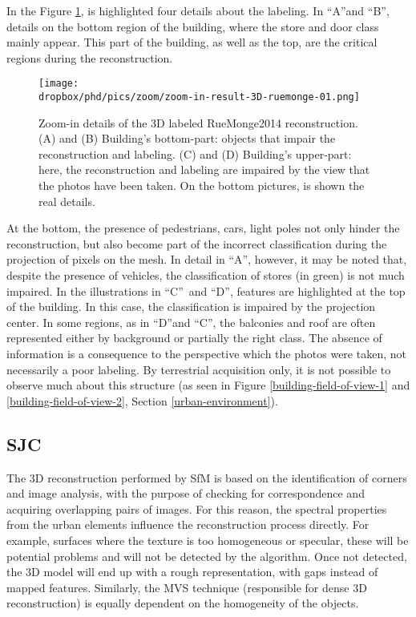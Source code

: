 In the Figure \ref{zoom-ruemonge}, is highlighted four details about the labeling. In \textquotedblleft A\textquotedblright and \textquotedblleft B\textquotedblright, details on the bottom region of the building, where the store and door class mainly appear. This part of the building, as well as the top, are the critical regions during the reconstruction. 
\begin{figure}[!htp]
    \centering	   
    \caption{Zoom-in details of the 3D labeled RueMonge2014 reconstruction. (A) and (B) Building's bottom-part: objects that impair the reconstruction and labeling. (C) and (D) Building's upper-part: here, the reconstruction and labeling are impaired by the view that the photos have been taken. On the bottom pictures, is shown the real details.}
    \vspace{6mm}    
    \texttt{[image: \\dropbox/phd/pics/zoom/zoom-in-result-3D-ruemonge-01.png]}
    \vspace{2mm}
	\legenda{}
    \label{zoom-ruemonge}
\end{figure}

At the bottom, the presence of pedestrians, cars, light poles not only hinder the reconstruction, but also become part of the incorrect classification during the projection of pixels on the mesh. In detail in \textquotedblleft A\textquotedblright, however, it may be noted that, despite the presence of vehicles, the classification of stores (in green) is not much impaired. In the illustrations in \textquotedblleft C\textquotedblright~and \textquotedblleft D\textquotedblright, features are highlighted at the top of the building. In this case, the classification is impaired by the projection center. In some regions, as in \textquotedblleft D\textquotedblright and \textquotedblleft C\textquotedblright, the balconies and roof are often represented either by background or partially the right class. The absence of information is a consequence to the perspective which the photos were taken, not necessarily a poor labeling. By terrestrial acquisition only, it is not possible to observe much about this structure (as seen in Figure \ref{building-field-of-view-1} and \ref{building-field-of-view-2}, Section \ref{urban-environment}).

\subsection{SJC}
The 3D reconstruction performed by SfM is based on the identification of corners and image analysis, with the purpose of checking for correspondence and acquiring overlapping pairs of images. For this reason, the spectral properties from the urban elements influence the reconstruction process directly. For example, surfaces where the texture is too homogeneous or specular, these will be potential problems and will not be detected by the algorithm. Once not detected, the 3D model will end up with a rough representation, with gaps instead of mapped features. Similarly, the MVS technique (responsible for dense 3D reconstruction) is equally dependent on the homogeneity of the objects.


